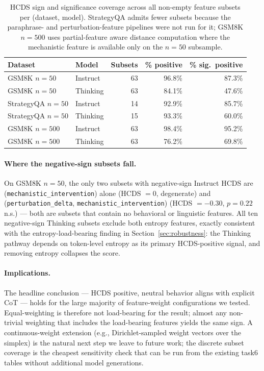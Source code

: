 \documentclass{article}
\theoremstyle{plain}
\theoremstyle{definition}
\theoremstyle{remark}
\begin{document}
\begin{table}[!htbp]
\centering
\small
\setlength{\tabcolsep}{4pt}
\begin{tabular}{@{}llrrr@{}}
\toprule
Dataset & Model & Subsets & \% positive & \% sig.\ positive \\
\midrule
GSM8K $n=50$       & Instruct & 63 & 96.8\% & 87.3\% \\
GSM8K $n=50$       & Thinking & 63 & 84.1\% & 47.6\% \\
StrategyQA $n=50$  & Instruct & 14 & 92.9\% & 85.7\% \\
StrategyQA $n=50$  & Thinking & 15 & 93.3\% & 60.0\% \\
GSM8K $n=500$      & Instruct & 63 & 98.4\% & 95.2\% \\
GSM8K $n=500$      & Thinking & 63 & 76.2\% & 69.8\% \\
\bottomrule
\end{tabular}
\caption{HCDS sign and significance coverage across all non-empty
feature subsets per (dataset, model). StrategyQA admits fewer
subsets because the paraphrase- and perturbation-feature pipelines
were not run for it; GSM8K $n=500$ uses partial-feature aware
distance computation where the mechanistic feature is available
only on the $n=50$ subsample.}
\label{tab:sensitivity}
\end{table}

\paragraph{Where the negative-sign subsets fall.} On GSM8K $n=50$,
the only two subsets with negative-sign Instruct HCDS are
(\texttt{mechanistic\_intervention}) alone (HCDS $=0$, degenerate)
and (\texttt{perturbation\_delta}, \texttt{mechanistic\_intervention})
(HCDS $=-0.30$, $p=0.22$ n.s.) --- both are subsets that contain
no behavioral or linguistic features. All ten negative-sign Thinking
subsets exclude both entropy features, exactly consistent with the
entropy-load-bearing finding in Section~\ref{sec:robustness}: the
Thinking pathway depends on token-level entropy as its primary
HCDS-positive signal, and removing entropy collapses the score.

\paragraph{Implications.} The headline conclusion --- HCDS positive,
neutral behavior aligns with explicit CoT --- holds for the large
majority of feature-weight configurations we tested. Equal-weighting
is therefore not load-bearing for the result; almost any non-trivial
weighting that includes the load-bearing features yields the same
sign. A continuous-weight extension (e.g., Dirichlet-sampled weight
vectors over the simplex) is the natural next step we leave to
future work; the discrete subset coverage is the cheapest
sensitivity check that can be run from the existing task6 tables
without additional model generations.
\end{document}
